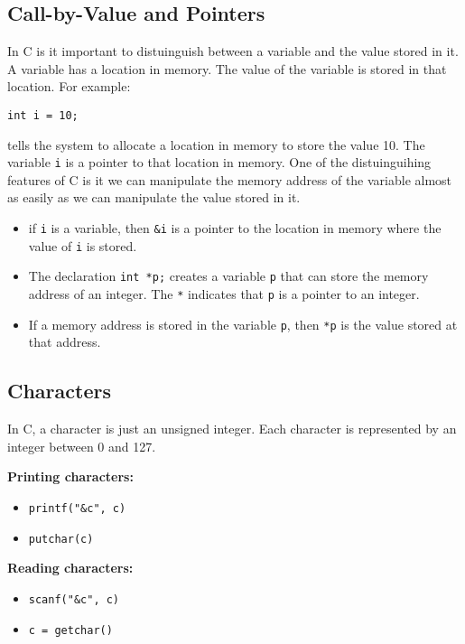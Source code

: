 \documentclass[a4paper, 10pt]{article}
\begin{document}
\subsection{Call-by-Value and Pointers}
In C is it important to distuinguish between a variable and the value stored in it. A variable has a location in memory. The value of the variable is stored in that location. For example:
\begin{lstlisting}[style=cStyle]
int i = 10;
\end{lstlisting}
tells the system to allocate a location in memory to store the value 10. The variable \texttt{i} is a pointer to that location in memory. One of the distuinguihing features of C is it we can manipulate the memory address of the variable almost as easily as we can manipulate the value stored in it.
\begin{definitionbox}[Pointers]
    \begin{itemize}
        \item if \texttt{i} is a variable, then \texttt{\&i} is a pointer to the location in memory where the value of \texttt{i} is stored.
        \item The declaration \texttt{int *p;} creates a variable \texttt{p} that can store the memory address of an integer. The \texttt{*} indicates that \texttt{p} is a pointer to an integer.
        \item If a memory address is stored in the variable \texttt{p}, then \texttt{*p} is the value stored at that address.
    \end{itemize}
\end{definitionbox}
\pagebreak
\subsection{Characters}
\begin{conceptbox}
    In C, a character is just an unsigned integer. Each character is represented by an integer between 0 and 127.
\end{conceptbox}

\begin{minipage}{0.45\textwidth}
    \textbf{Printing characters:}

    \begin{itemize}
        \item \texttt{printf("\&c", c)}
        \item \texttt{putchar(c)}
    \end{itemize}
\end{minipage}
\begin{minipage}{0.45\textwidth}
    \textbf{Reading characters:}
    \begin{itemize}
        \item \texttt{scanf("\&c", c)}
        \item \texttt{c = getchar()}
    \end{itemize}
\end{minipage}
\end{document}
